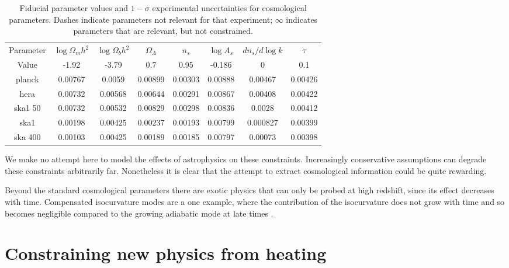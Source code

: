 \documentclass{PoS}
\begin{document}
\begin{table}[htdp]
\caption{Fiducial parameter values and $1-\sigma$ experimental uncertainties for cosmological parameters.  Dashes indicate parameters not relevant for that experiment; $\infty$ indicates parameters that are relevant, but not constrained. }
\begin{center}
\begin{tabular}{c|cccccc|c}
\hline
Parameter & $\log\Omega_mh^2$ & $\log\Omega_bh^2$ & $\Omega_\Lambda$ & $n_s$ & $\log A_s$ & $dn_s/d\log k$ & $\tau$ \\
Value & -1.92 & -3.79 & 0.7 & 0.95 & -0.186 & 0 & 0.1 \\
planck & 0.00767 & 0.0059 & 0.00899 & 0.00303 & 0.00888 & 0.00467 & 0.00426 \\
hera & 0.00732 & 0.00568 & 0.00644 & 0.00291 & 0.00867 & 0.00408 & 0.00422 \\
ska1 50 & 0.00732 & 0.00532 & 0.00829 & 0.00298 & 0.00836 & 0.0028 & 0.00412 \\
ska1 & 0.00198 & 0.00425 & 0.00237 & 0.00193 & 0.00799 & 0.000827 & 0.00399 \\
ska 400 & 0.00103 & 0.00425 & 0.00189 & 0.00185 & 0.00797 & 0.00073 & 0.00398 \\
\end{tabular}
\end{center}
\label{tab:constraints}
\end{table}

We make no attempt here to model the effects of astrophysics on these constraints. Increasingly conservative assumptions can degrade these constraints arbitrarily far. Nonetheless it is clear that the attempt to extract cosmological information could be quite rewarding. 

Beyond the standard cosmological parameters there are exotic physics that can only be probed at high redshift, since its effect decreases with time. Compensated isocurvature modes are a one example, where the contribution of the isocurvature does not grow with time and so becomes negligible compared to the growing adiabatic mode at late times \citep{2009PhRvD..80f3535G}.



\section{Constraining new physics from heating}
\label{sec:heating}
\end{document}

